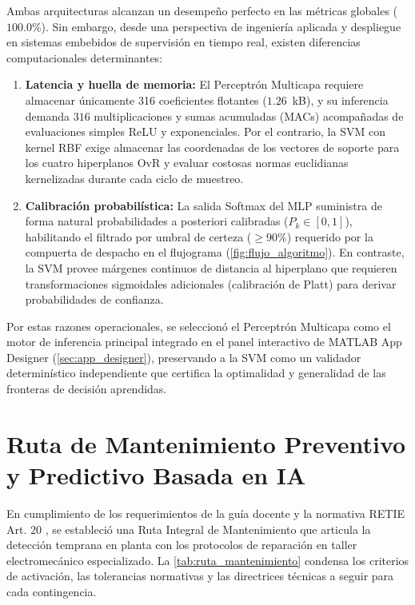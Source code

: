\documentclass[conference]{IEEEtran}
\begin{document}
Ambas arquitecturas alcanzan un desempeño perfecto en las métricas globales ($100.0\%$). Sin embargo, desde una perspectiva de ingeniería aplicada y despliegue en sistemas embebidos de supervisión en tiempo real, existen diferencias computacionales determinantes:
\begin{enumerate}
    \item \textbf{Latencia y huella de memoria:} El Perceptrón Multicapa requiere almacenar únicamente 316 coeficientes flotantes ($1.26$~kB), y su inferencia demanda $316$ multiplicaciones y sumas acumuladas (MACs) acompañadas de evaluaciones simples ReLU y exponenciales. Por el contrario, la SVM con kernel RBF exige almacenar las coordenadas de los vectores de soporte para los cuatro hiperplanos OvR y evaluar costosas normas euclidianas kernelizadas durante cada ciclo de muestreo.
    \item \textbf{Calibración probabilística:} La salida Softmax del MLP suministra de forma natural probabilidades a posteriori calibradas ($P_k \in [0, 1]$), habilitando el filtrado por umbral de certeza ($\ge 90\%$) requerido por la compuerta de despacho en el flujograma (\autoref{fig:flujo_algoritmo}). En contraste, la SVM provee márgenes continuos de distancia al hiperplano que requieren transformaciones sigmoidales adicionales (calibración de Platt) para derivar probabilidades de confianza.
\end{enumerate}

Por estas razones operacionales, se seleccionó el Perceptrón Multicapa como el motor de inferencia principal integrado en el panel interactivo de MATLAB App Designer (\autoref{sec:app_designer}), preservando a la SVM como un validador determinístico independiente que certifica la optimalidad y generalidad de las fronteras de decisión aprendidas.

\section{Ruta de Mantenimiento Preventivo y Predictivo Basada en IA}

En cumplimiento de los requerimientos de la guía docente y la normativa RETIE Art. 20 \cite{retie2013}, se estableció una Ruta Integral de Mantenimiento que articula la detección temprana en planta con los protocolos de reparación en taller electromecánico especializado. La \autoref{tab:ruta_mantenimiento} condensa los criterios de activación, las tolerancias normativas y las directrices técnicas a seguir para cada contingencia.
\end{document}
